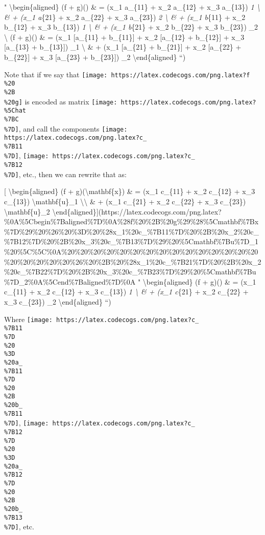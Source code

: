\documentclass[]{article}
\begin{document}
" \textbackslash{}begin\{aligned\} (f + g)() \& = (x\_1 a\_\{11\} +
x\_2 a\_\{12\} + x\_3 a\_\{13\}) \emph{1 \textbackslash{} \& + (x\_1
a}\{21\} + x\_2 a\_\{22\} + x\_3 a\_\{23\}) \emph{2 \textbackslash{}
\& + (x\_1 b}\{11\} + x\_2 b\_\{12\} + x\_3 b\_\{13\}) \emph{1
\textbackslash{} \& + (x\_1 b}\{21\} + x\_2 b\_\{22\} + x\_3 b\_\{23\})
\_2 \textbackslash{} (f + g)() \& = (x\_1 {[}a\_\{11\} +
b\_\{11\}{]} + x\_2 {[}a\_\{12\} + b\_\{12\}{]} + x\_3 {[}a\_\{13\} +
b\_\{13\}{]}) \_1 \textbackslash{} \& + (x\_1 {[}a\_\{21\} +
b\_\{21\}{]} + x\_2 {[}a\_\{22\} + b\_\{22\}{]} + x\_3 {[}a\_\{23\} +
b\_\{23\}{]}) \_2 \textbackslash{}end\{aligned\} ``)

Note that if we say that
\texttt{[image: https://latex.codecogs.com/png.latex?f\\\%20\\\%2B\\\%20g]} is encoded
as matrix
\texttt{[image: https://latex.codecogs.com/png.latex?\\\%5Chat\\\%7BC\\\%7D]}, and
call the components
\texttt{[image: https://latex.codecogs.com/png.latex?c\_\\\%7B11\\\%7D]},
\texttt{[image: https://latex.codecogs.com/png.latex?c\_\\\%7B12\\\%7D]}, etc., then
we can rewrite that as:

{[} \textbackslash{}begin\{aligned\} (f + g)(\textbackslash{}mathbf\{x\}) \& =
(x\_1 c\_\{11\} + x\_2 c\_\{12\} + x\_3 c\_\{13\})
\textbackslash{}mathbf\{u\}\_1 \textbackslash{}\textbackslash{} \& + (x\_1
c\_\{21\} + x\_2 c\_\{22\} + x\_3 c\_\{23\}) \textbackslash{}mathbf\{u\}\_2
\textbackslash{}end\{aligned\}{]}(https://latex.codecogs.com/png.latex?\%0A\%5Cbegin\%7Baligned\%7D\%0A\%28f\%20\%2B\%20g\%29\%28\%5Cmathbf\%7Bx\%7D\%29\%20\%26\%20\%3D\%20\%28x\_1\%20c\_\%7B11\%7D\%20\%2B\%20x\_2\%20c\_\%7B12\%7D\%20\%2B\%20x\_3\%20c\_\%7B13\%7D\%29\%20\%5Cmathbf\%7Bu\%7D\_1\%20\%5C\%5C\%0A\%20\%20\%20\%20\%20\%20\%20\%20\%20\%20\%20\%20\%20\%20\%20\%20\%20\%20\%20\%20\%26\%20\%2B\%20\%28x\_1\%20c\_\%7B21\%7D\%20\%2B\%20x\_2\%20c\_\%7B22\%7D\%20\%2B\%20x\_3\%20c\_\%7B23\%7D\%29\%20\%5Cmathbf\%7Bu\%7D\_2\%0A\%5Cend\%7Baligned\%7D\%0A
" \textbackslash{}begin\{aligned\} (f + g)() \& = (x\_1 c\_\{11\} +
x\_2 c\_\{12\} + x\_3 c\_\{13\}) \emph{1 \textbackslash{} \& + (x\_1
c}\{21\} + x\_2 c\_\{22\} + x\_3 c\_\{23\}) \_2
\textbackslash{}end\{aligned\} ``)

Where
\texttt{[image: https://latex.codecogs.com/png.latex?c\_\\\%7B11\\\%7D\\\%20\\\%3D\\\%20a\_\\\%7B11\\\%7D\\\%20\\\%2B\\\%20b\_\\\%7B11\\\%7D]},
\texttt{[image: https://latex.codecogs.com/png.latex?c\_\\\%7B12\\\%7D\\\%20\\\%3D\\\%20a\_\\\%7B12\\\%7D\\\%20\\\%2B\\\%20b\_\\\%7B13\\\%7D]},
etc.
\end{document}
